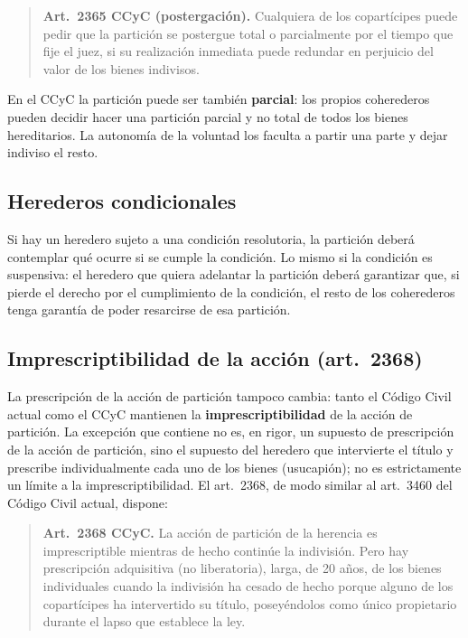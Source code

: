 \documentclass[12pt,oneside]{book}
\begin{document}
\begin{quote}
\textbf{Art.~2365 CCyC (postergación).} Cualquiera de los copartícipes puede pedir que la partición se postergue total o parcialmente por el tiempo que fije el juez, si su realización inmediata puede redundar en perjuicio del valor de los bienes indivisos.
\end{quote}

En el CCyC la partición puede ser también \textbf{parcial}: los propios coherederos pueden decidir hacer una partición parcial y no total de todos los bienes hereditarios. La autonomía de la voluntad los faculta a partir una parte y dejar indiviso el resto.

\subsection{Herederos condicionales}

Si hay un heredero sujeto a una condición resolutoria, la partición deberá contemplar qué ocurre si se cumple la condición. Lo mismo si la condición es suspensiva: el heredero que quiera adelantar la partición deberá garantizar que, si pierde el derecho por el cumplimiento de la condición, el resto de los coherederos tenga garantía de poder resarcirse de esa partición.

\subsection{Imprescriptibilidad de la acción (art.~2368)}

La prescripción de la acción de partición tampoco cambia: tanto el Código Civil actual como el CCyC mantienen la \textbf{imprescriptibilidad} de la acción de partición. La excepción que contiene no es, en rigor, un supuesto de prescripción de la acción de partición, sino el supuesto del heredero que intervierte el título y prescribe individualmente cada uno de los bienes (usucapión); no es estrictamente un límite a la imprescriptibilidad. El art.~2368, de modo similar al art.~3460 del Código Civil actual, dispone:

\begin{quote}
\textbf{Art.~2368 CCyC.} La acción de partición de la herencia es imprescriptible mientras de hecho continúe la indivisión. Pero hay prescripción adquisitiva (no liberatoria), larga, de 20 años, de los bienes individuales cuando la indivisión ha cesado de hecho porque alguno de los copartícipes ha intervertido su título, poseyéndolos como único propietario durante el lapso que establece la ley.
\end{quote}
\end{document}
